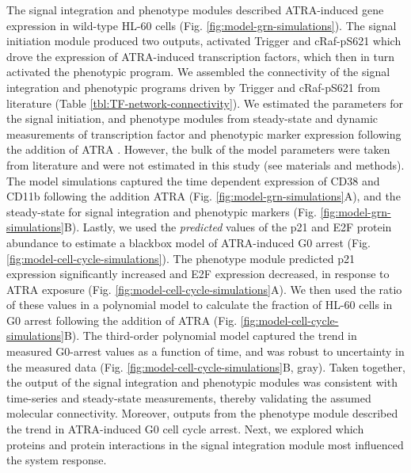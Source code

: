 \documentclass[12pt]{article}
\begin{document}
The signal integration and phenotype modules described ATRA-induced gene expression in wild-type HL-60 cells (Fig. \ref{fig:model-grn-simulations}).
The signal initiation module produced two outputs, activated Trigger and cRaf-pS621 which drove the expression of ATRA-induced transcription factors,
which then in turn activated the phenotypic program.
We assembled the connectivity of the signal integration and phenotypic programs driven by Trigger and cRaf-pS621 from literature (Table \ref{tbl:TF-network-connectivity}).
We estimated the parameters for the signal initiation, and phenotype modules
from steady-state and dynamic measurements of transcription factor and phenotypic marker expression following the addition of ATRA \cite{Jensen:2013aa,Jensen:2014aa,Jensen:2015ab,Jensen:2015aa}.
However, the bulk of the model parameters were taken from literature \cite{Milo:2010aa} and were not estimated in this study (see materials and methods).
The model simulations captured the time dependent expression of CD38 and CD11b following the addition ATRA (Fig. \ref{fig:model-grn-simulations}A),
and the steady-state for signal integration and phenotypic markers (Fig. \ref{fig:model-grn-simulations}B).
Lastly, we used the \textit{predicted} values of the p21 and E2F protein abundance to estimate a blackbox model of ATRA-induced G0 arrest (Fig. \ref{fig:model-cell-cycle-simulations}).
The phenotype module predicted p21 expression significantly increased and E2F expression decreased, in response to ATRA exposure (Fig. \ref{fig:model-cell-cycle-simulations}A).
We then used the ratio of these values in a polynomial model to calculate the fraction of HL-60 cells in G0 arrest following the addition of ATRA (Fig. \ref{fig:model-cell-cycle-simulations}B).
The third-order polynomial model captured the trend in measured G0-arrest values as a function of time, and was robust to uncertainty in the measured data (Fig. \ref{fig:model-cell-cycle-simulations}B, gray).
Taken together, the output of the signal integration and phenotypic modules was consistent with time-series and steady-state measurements, thereby validating the assumed molecular connectivity.
Moreover, outputs from the phenotype module described the trend in ATRA-induced G0 cell cycle arrest.
Next, we explored which proteins and protein interactions in the signal integration module most influenced the system response.
\end{document}
